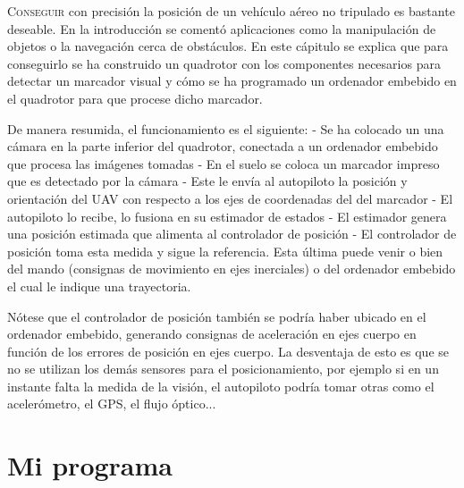 \lettrine[lraise=-0.1, lines=2, loversize=0.2]{C}{onseguir} con precisión la posición de un vehículo aéreo no tripulado es bastante deseable. En la introducción se comentó aplicaciones como la manipulación de objetos o la navegación cerca de obstáculos. En este cápitulo se explica que para conseguirlo se ha construido un quadrotor con los componentes necesarios para detectar un marcador visual y cómo se ha programado un ordenador embebido en el quadrotor para que procese dicho marcador. 

De manera resumida, el funcionamiento es el siguiente:
- Se ha colocado un una cámara en la parte inferior del quadrotor, conectada a un ordenador embebido que procesa las imágenes tomadas
- En el suelo se coloca un marcador impreso que es detectado por la cámara
- Este le envía al autopiloto la posición y orientación del UAV con respecto a los ejes de coordenadas del del marcador 
- El autopiloto lo recibe, lo fusiona en su estimador de estados
- El estimador genera una posición estimada que alimenta al controlador de posición
- El controlador de posición toma esta medida y sigue la referencia. Esta última puede venir o bien del mando (consignas de movimiento en ejes inerciales) o del ordenador embebido el cual le indique una trayectoria.

Nótese que el controlador de posición también se podría haber ubicado en el ordenador embebido, generando consignas de aceleración en ejes cuerpo en función de los errores de posición en ejes cuerpo. La desventaja de esto es que se no se utilizan los demás sensores para el posicionamiento, por ejemplo si en un instante falta la medida de la visión, el autopiloto podría tomar otras como el acelerómetro, el GPS, el flujo óptico... 

\section{Mi programa}

\figFlow


